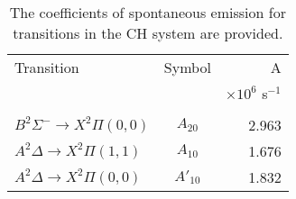 \begin{table}
  \caption[CH emission coefficients]{The coefficients of spontaneous emission for transitions in the CH system are provided.}
  \begin{center}
    \begin{tabular}{lcr}
      Transition & Symbol & A \tabularnewline
      & & \(\times 10^6\) s\(^{-1}\) \tabularnewline
      \hline\hline
      & & \tabularnewline
      \(B^2\Sigma^-\rightarrow X^2\Pi(0,0)\) & \(A_{20}\) & 2.963 \tabularnewline
      \(A^2\Delta\rightarrow X^2\Pi(1,1)\) & \(A_{10}\) & 1.676 \tabularnewline
      \(A^2\Delta\rightarrow X^2\Pi(0,0)\) & \(A'_{10}\) & 1.832 \tabularnewline
      \hline
    \end{tabular}
  \end{center}
  \label{tab:emissionCoefficients}
\end{table}

